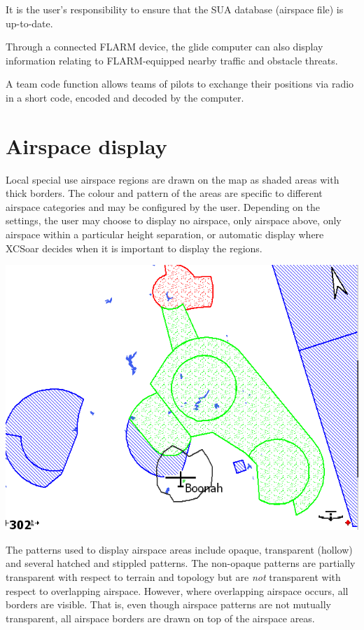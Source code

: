 \documentclass[a4paper,12pt]{refrep}
\begin{document}
It is the user's responsibility to ensure that the SUA database
(airspace file) is up-to-date.

Through a connected FLARM device, the glide computer can also
display information relating to FLARM-equipped nearby traffic
and obstacle threats.

A team code function allows teams of pilots to exchange their
positions via radio in a short code, encoded and decoded by the
computer.

\section{Airspace display}

Local special use airspace regions are drawn on the map as shaded
areas with thick borders.  The colour and pattern of the areas are
specific to different airspace categories and may be configured by the
user.  Depending on the settings, the user may choose to display no
airspace, only airspace above, only airspace within a particular
height separation, or automatic display where XCSoar decides when it
is important to display the regions.

\begin{center}
\includegraphics[angle=0,width=\linewidth,keepaspectratio='true']{figures/airspace.png}
\end{center}

The patterns used to display airspace areas include opaque,
transparent (hollow) and several hatched and stippled patterns.  The
non-opaque patterns are partially transparent with respect to terrain
and topology but are {\em not} transparent with respect to overlapping
airspace.  However, where overlapping airspace occurs, all borders are
visible.  That is, even though airspace patterns are not mutually
transparent, all airspace borders are drawn on top of the airspace
areas.
\end{document}
